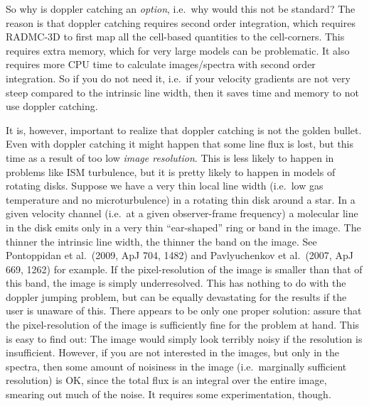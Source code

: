 \documentclass{report}
\begin{document}
So why is doppler catching an {\em option}, i.e.\ why would this not be
standard?  The reason is that doppler catching requires second order
integration, which requires RADMC-3D to first map all the cell-based
quantities to the cell-corners. This requires extra memory, which for very
large models can be problematic. It also requires more CPU time to calculate
images/spectra with second order integration. So if you do not need it,
i.e.\ if your velocity gradients are not very steep compared to the
intrinsic line width, then it saves time and memory to not use doppler
catching.

It is, however, important to realize that doppler catching is not the golden
bullet. Even with doppler catching it might happen that some line flux is
lost, but this time as a result of too low {\em image resolution}. This is
less likely to happen in problems like ISM turbulence, but it is pretty
likely to happen in models of rotating disks. Suppose we have a very thin
local line width (i.e.\ low gas temperature and no microturbulence) in a
rotating thin disk around a star. In a given velocity channel (i.e.\ at a
given observer-frame frequency) a molecular line in the disk emits only in a
very thin ``ear-shaped'' ring or band in the image. The thinner the
intrinsic line width, the thinner the band on the image. See Pontoppidan et
al.~(2009, ApJ 704, 1482) and Pavlyuchenkov et al.~(2007, ApJ 669, 1262) for
example. If the pixel-resolution of the image is smaller than that of this
band, the image is simply underresolved.  This has nothing to do with the
doppler jumping problem, but can be equally devastating for the results if
the user is unaware of this. There appears to be only one proper solution:
assure that the pixel-resolution of the image is sufficiently fine for the
problem at hand. This is easy to find out: The image would simply look
terribly noisy if the resolution is insufficient. However, if you are not
interested in the images, but only in the spectra, then some amount of
noisiness in the image (i.e.\ marginally sufficient resolution) is OK, since
the total flux is an integral over the entire image, smearing out much of
the noise.  It requires some experimentation, though.
\end{document}
